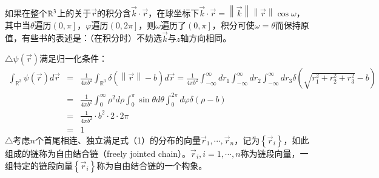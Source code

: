 \documentclass{article} %
\begin{document}
\noindent 如果在整个${\mathbb R}^{{\rm 3}} $上的关于$\vec{r}$的积分含$\vec{k}\cdot \vec{r}$，在球坐标下$\vec{k}\cdot \vec{r}=\left\| \vec{k}\right\| \left\| \vec{r}\right\| \cos \omega $，其中当$\theta $遍历$\left(0,\left. \pi \right]\right. $，$\varphi $遍历$\left(0,\left. 2\pi \right]\right. $，则$\omega $遍历了$\left(0,\left. \pi \right]\right. $，积分可使$\omega =\theta $而保持原值，有些书的表述是：（在积分时）不妨选$\vec{k}$与$z$轴方向相同。

\noindent $\mathrm{\triangle}$$\psi \left(\vec{r}\right)$满足归一化条件：
\[\begin{array}{rcl} {\int _{{\mathbb R}^{3} }\psi \left(\vec{r}\right)d \vec{r}} & {=} & {\frac{1}{4\pi b^{2} } \int _{{\mathbb R}^{3} }\delta \left(\left\| \vec{r}\right\| -b\right) d\vec{r}=\frac{1}{4\pi b^{2} } \int _{-\infty }^{\infty }dr_{1}  \int _{-\infty }^{\infty }dr_{2}  \int _{-\infty }^{\infty }dr_{3}  \delta \left(\sqrt{r_{1}^{2} +r_{2}^{2} +r_{3}^{2} } -b\right)} \\ {} & {=} & {\frac{1}{4\pi b^{2} } \int _{0}^{\infty }\rho ^{2}  d\rho \int _{0}^{\pi }\sin \theta  d\theta \int _{0}^{2\pi }d\varphi \delta \left(\rho -b\right) } \\ {} & {=} & {\frac{1}{4\pi b^{2} } \cdot b^{2} \cdot 2\cdot 2\pi } \\ {} & {=} & {1} \end{array}\] 
$\mathrm{\triangle}$考虑$n$个首尾相连、独立满足式（1）的分布的向量$\vec{r}_{1} ,\cdots ,\vec{r}_{n} $，记为$\left\{\vec{r}_{i} \right\}$，如此组成的链称为自由结合链（freely jointed chain）。$\vec{r}_{i} ,i=1,\cdots ,n$称为链段向量，一组特定的链段向量$\left\{\vec{r}_{i} \right\}$称为自由结合链的一个构象。
\end{document}
